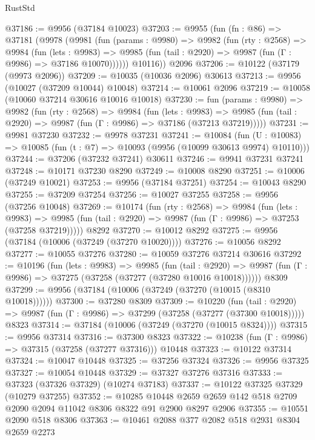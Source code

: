 \begin{lexlean}{RustStd}
\begin{coremodule}
@37186 := @9956 (@37184 @10023)
@37203 := @9955
    (fun (fn : @86) =>
    @37181
      (@9978
        (@9981
          (fun (params : @9980) =>
          @9982
            (fun (rty : @2568) =>
            @9984
              (fun (lets : @9983) =>
              @9985 (fun (tail : @2920) => @9987 (fun (Γ : @9986) => @37186 @10070))))))
        @10116))
    @2096
@37206 := @10122 (@37179 (@9973 @2096))
@37209 := @10035 (@10036 @2096) @30613
@37213 := @9956 (@10027 (@37209 @10044) @10048)
@37214 := @10061 @2096
@37219 := @10058 (@10060 @37214 @30616 @10016 @10018)
@37230 := fun (params : @9980) =>
  @9982
    (fun (rty : @2568) =>
    @9984
      (fun (lets : @9983) =>
      @9985 (fun (tail : @2920) => @9987 (fun (Γ : @9986) => @37186 (@37213 @37219)))))
@37231 := @9981 @37230
@37232 := @9978 @37231
@37241 := @10084
    (fun (U : @10083) => @10085 (fun (t : @7) => @10093 (@9956 (@10099 @30613 @9974) @10110)))
@37244 := @37206 (@37232 @37241) @30611
@37246 := @9941 @37231 @37241
@37248 := @10171 @37230 @8290
@37249 := @10008 @8290
@37251 := @10006 (@37249 @10021)
@37253 := @9956 (@37184 @37251)
@37254 := @10043 @8290
@37255 := @37209 @37254
@37256 := @10027 @37255
@37258 := @9956 (@37256 @10048)
@37269 := @10174
    (fun (rty : @2568) =>
    @9984
      (fun (lets : @9983) =>
      @9985 (fun (tail : @2920) => @9987 (fun (Γ : @9986) => @37253 (@37258 @37219)))))
    @8292
@37270 := @10012 @8292
@37275 := @9956 (@37184 (@10006 (@37249 (@37270 @10020))))
@37276 := @10056 @8292
@37277 := @10055 @37276
@37280 := @10059 @37276 @37214 @30616
@37292 := @10196
    (fun (lets : @9983) =>
    @9985
      (fun (tail : @2920) =>
      @9987 (fun (Γ : @9986) => @37275 (@37258 (@37277 (@37280 @10016 @10018))))))
    @8309
@37299 := @9956 (@37184 (@10006 (@37249 (@37270 (@10015 (@8310 @10018))))))
@37300 := @37280 @8309
@37309 := @10220
    (fun (tail : @2920) => @9987 (fun (Γ : @9986) => @37299 (@37258 (@37277 (@37300 @10018)))))
    @8323
@37314 := @37184 (@10006 (@37249 (@37270 (@10015 @8324))))
@37315 := @9956 @37314
@37316 := @37300 @8323
@37322 := @10238 (fun (Γ : @9986) => @37315 (@37258 (@37277 @37316))) @10448
@37323 := @10122 @37314
@37324 := @10047 @10448
@37325 := @37256 @37324
@37326 := @9956 @37325
@37327 := @10054 @10448
@37329 := @37327 @37276 @37316
@37333 := @37323 (@37326 @37329) (@10274 @37183)
@37337 := @10122 @37325 @37329 (@10279 @37255)
@37352 := @10285
    @10448
    @2659
    @2659
    @142
    @518
    @2709
    @2090
    @2094
    @11042
    @8306
    @8322
    @91
    @2900
    @8297
    @2906
@37355 := @10551 @2090 @518 @8306
@37363 := @10461 @2088 @377 @2082 @518 @2931 @8304 @2659 @2273

\end{coremodule}
\end{lexlean}
